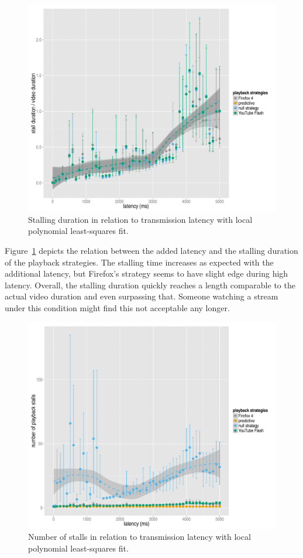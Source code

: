 \begin{figure}[htb]
	\centering
	\includegraphics[width=1.0\textwidth]{images/R-playbackemulation-stallduration-latency.pdf}
	\caption{Stalling duration in relation to transmission latency with local polynomial least-squares fit.}
\label{c3:fig:eval-latency-stallingtime}
\end{figure}

Figure~\ref{c3:fig:eval-latency-stallingtime} depicts the relation between the added latency and the stalling duration of the playback strategies. The stalling time increases as expected with the additional latency, but Firefox's strategy seems to have slight edge during high latency. Overall, the stalling duration quickly reaches a length comparable to the actual video duration and even surpassing that. Someone watching a stream under this condition might find this not acceptable any longer.

\begin{figure}[htb]
	\centering
	\includegraphics[width=1.0\textwidth]{images/R-playbackemulation-stallnumber-latency.pdf}
	\caption{Number of stalls in relation to transmission latency with local polynomial least-squares fit.}
\label{c3:fig:eval-latency-numstalls}
\end{figure}

